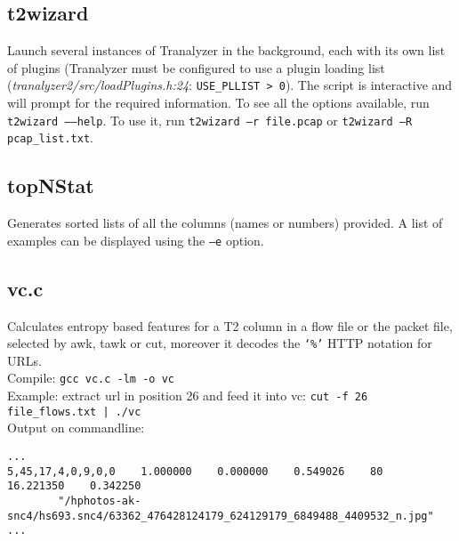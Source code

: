 \documentclass[documentation]{subfiles}
\begin{document}
\subsection{t2wizard}\label{t2wizard}
Launch several instances of Tranalyzer in the background, each with its own
list of plugins (Tranalyzer must be configured to use a plugin loading list
({\em tranalyzer2/src/loadPlugins.h:24}: {\tt USE\_PLLIST > 0}). The script
is interactive and will prompt for the required information. To see all
the options available, run {\tt t2wizard --{}--help}. To use it, run
{\tt t2wizard --r file.pcap} or {\tt t2wizard --R pcap\_list.txt}.

\subsection{topNStat}
Generates sorted lists of all the columns (names or numbers) provided.
A list of examples can be displayed using the {\tt --e} option.

\subsection{vc.c}
Calculates entropy based features for a T2 column in a flow file or the packet file, selected by awk, tawk or cut, moreover it decodes the {\tt `\%'} HTTP notation for URLs.\\
Compile: {\tt gcc vc.c -lm -o vc} \\
Example: extract url in position 26 and feed it into vc:
{\tt cut -f 26 file\_flows.txt | ./vc} \\
Output on commandline:
\begin{verbatim}
...
5,45,17,4,0,9,0,0    1.000000    0.000000    0.549026    80    16.221350    0.342250
        "/hphotos-ak-snc4/hs693.snc4/63362_476428124179_624129179_6849488_4409532_n.jpg"
...
\end{verbatim}

\ifcurrfiledir{}
    {}
    {}

\ifcurrfiledir{}
    {}
    {}
\end{document}

